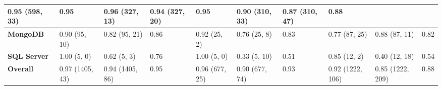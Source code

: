 \begin{table*}[!ht]
\begin{tabular}{|l|lll|lll|lll|}
  \multicolumn{1}{l|}{0.95 (598, 33)} &
  0.95 &
  \multicolumn{1}{l|}{0.96 (327, 13)} &
  \multicolumn{1}{l|}{0.94 (327, 20)} &
  0.95 &
  \multicolumn{1}{l|}{0.90 (310, 33)} &
  \multicolumn{1}{l|}{0.87 (310, 47)} &
  0.88 \\ \hline
\textbf{MongoDB} &
  \multicolumn{1}{l|}{0.90 (95, 10)} &
  \multicolumn{1}{l|}{0.82 (95, 21)} &
  0.86 &
  \multicolumn{1}{l|}{0.92 (25, 2)} &
  \multicolumn{1}{l|}{0.76 (25, 8)} &
  0.83 &
  \multicolumn{1}{l|}{0.77 (87, 25)} &
  \multicolumn{1}{l|}{0.88 (87, 11)} &
  0.82 \\ \hline
\textbf{SQL Server} &
  \multicolumn{1}{l|}{1.00 (5, 0)} &
  \multicolumn{1}{l|}{0.62 (5, 3)} &
  0.76 &
  \multicolumn{1}{l|}{1.00 (5, 0)} &
  \multicolumn{1}{l|}{0.33 (5, 10)} &
  0.51 &
  \multicolumn{1}{l|}{0.85 (12, 2)} &
  \multicolumn{1}{l|}{0.40 (12, 18)} &
  0.54 \\ \hline
\textbf{Overall} &
  \multicolumn{1}{l|}{\cellcolor[HTML]{C0C0C0}0.97 (1405, 43)} &
  \multicolumn{1}{l|}{\cellcolor[HTML]{C0C0C0}0.94 (1405, 86)} &
  \cellcolor[HTML]{C0C0C0}0.95 &
  \multicolumn{1}{l|}{\cellcolor[HTML]{C0C0C0}0.96 (677, 25)} &
  \multicolumn{1}{l|}{\cellcolor[HTML]{C0C0C0}0.90 (677, 74)} &
  \cellcolor[HTML]{C0C0C0}0.93 &
  \multicolumn{1}{l|}{\cellcolor[HTML]{C0C0C0}0.92 (1222, 106)} &
  \multicolumn{1}{l|}{\cellcolor[HTML]{C0C0C0}0.85 (1222, 209)} &
  \cellcolor[HTML]{C0C0C0}0.88 \\ \hline
\end{tabular}%
\end{table*}